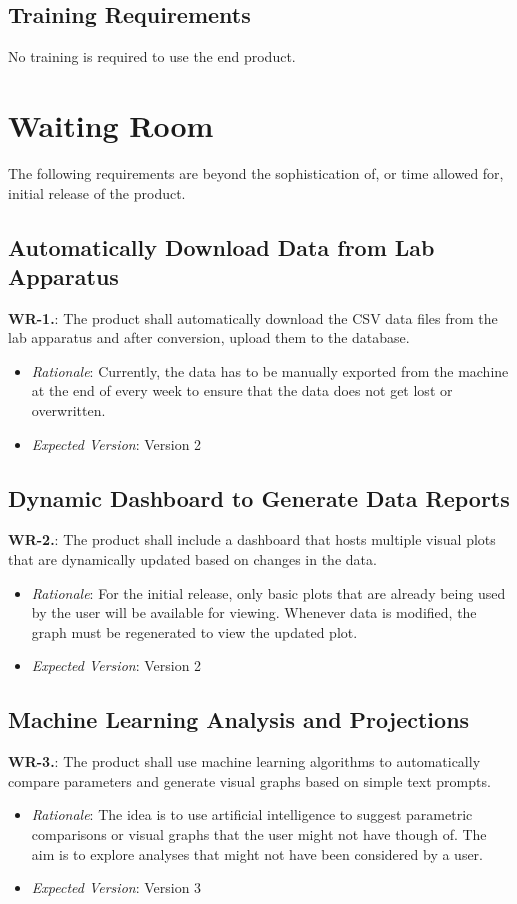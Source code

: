 \documentclass[12pt]{article}
\begin{document}
\subsection{Training Requirements}
No training is required to use the end product.
\section{Waiting Room}
The following requirements are beyond the sophistication of, or time allowed for, initial release of the product.
\subsection{Automatically Download Data from Lab Apparatus}
\textbf{WR-1.}: The product shall automatically download the CSV data files from the lab apparatus and after conversion, upload them to the database.
\begin{itemize}
  \item \emph{Rationale}: Currently, the data has to be manually exported from the machine at the end of every week to ensure that the data does not get lost or overwritten.
  \item \emph{Expected Version}: Version 2
\end{itemize}

\subsection{Dynamic Dashboard to Generate Data Reports}
\textbf{WR-2.}: The product shall include a dashboard that hosts multiple visual plots that are dynamically updated based on changes in the data.
\begin{itemize}
  \item \emph{Rationale}: For the initial release, only basic plots that are already being used by the user will be available for viewing. Whenever data is modified, the graph
  must be regenerated to view the updated plot.
  \item \emph{Expected Version}: Version 2
\end{itemize}

\subsection{Machine Learning Analysis and Projections}
\textbf{WR-3.}: The product shall use machine learning algorithms to automatically compare parameters and generate visual graphs based on simple text prompts.
\begin{itemize}
  \item \emph{Rationale}: The idea is to use artificial intelligence to suggest parametric comparisons or visual graphs that the user might not have though of. The aim is to
  explore analyses that might not have been considered by a user.
  \item \emph{Expected Version}: Version 3
\end{itemize}
\end{document}
